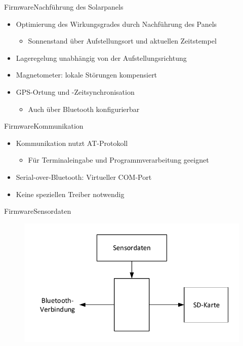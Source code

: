 \documentclass{beamer}
\begin{document}
\begin{frame}{Firmware}{Nachführung des Solarpanels}
    \begin{itemize}[<+->]
        \item Optimierung des Wirkungsgrades durch Nachführung des Panels
        \begin{itemize}
            \item Sonnenstand über Aufstellungsort und aktuellen Zeitstempel
        \end{itemize}
        \item Lageregelung unabhängig von der Aufstellungsrichtung
        \item Magnetometer: lokale Störungen kompensiert
        \item GPS-Ortung und -Zeitsynchronisation
        \begin{itemize}
            \item Auch über Bluetooth konfigurierbar
        \end{itemize}
    \end{itemize}
\end{frame}

\begin{frame}{Firmware}{Kommunikation}
    \begin{itemize}[<+->]
        \item Kommunikation nutzt AT-Protokoll
        \begin{itemize}
            \item Für Terminaleingabe und Programmverarbeitung geeignet
        \end{itemize}
        \item Serial-over-Bluetooth: Virtueller COM-Port
        \item Keine speziellen Treiber notwendig
    \end{itemize}    
\end{frame}

\begin{frame}{Firmware}{Sensordaten}
    \begin{figure}
        \centering
        \includegraphics[width=\textwidth]{./img/Datenverteilung.pdf}
    \end{figure}
\end{frame}
\end{document}
